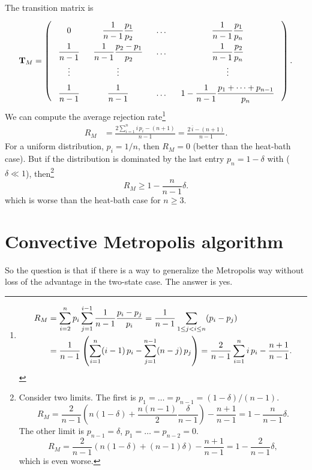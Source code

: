 \documentclass[12pt]{article}
\begin{document}
The transition matrix is
$$
\mathbf T_M =
\left(
  \arraycolsep=8.0pt\def\arraystretch{2.0}
  \begin{array}{cccccc}
    0   & \dfrac{1}{n-1}\dfrac{p_1}{p_2} & \dots & \dfrac{1}{n-1}\dfrac{p_1}{p_n} \\
    \dfrac{1}{n-1} & \dfrac{1}{n-1}\dfrac{p_2-p_1}{p_2} & \dots & \dfrac{1}{n-1}\dfrac{p_2}{p_n} \\
    \vdots & \vdots  &  & \vdots \\
    \dfrac{1}{n-1} & \dfrac{1}{n-1} & \dots & 1 - \dfrac{1}{n-1}\dfrac{p_1 + \cdots + p_{n-1}}{p_n}
  \end{array}
\right).
$$
We can compute the average rejection rate\footnote{
\begin{align*}
  R_M
  &= \sum_{i = 2}^n p_i \sum_{j = 1}^{i-1} \frac{1}{n-1} \frac{p_i - p_j} { p_i }
  = \frac{1}{n-1} \sum_{1 \le j < i \le n} (p_i - p_j)
  \notag \\
  &= \frac{1}{n-1} \left( \sum_{i=1}^n (i - 1) \, p_i - \sum_{j = 1}^{n-1} (n - j) \, p_j \right)
  = \frac{2}{n-1} \sum_{i=1}^n i \, p_i - \frac{n+1}{n-1}.
\end{align*}
}
\begin{align}
  R_M
  &= \frac{2 \sum_{i=1}^n i \, p_i - (n + 1) }{n-1}
  = \frac{ 2 \, \overline i - (n + 1) } { n - 1 }.
\label{eq:rejection_Metropolis}
\end{align}
For a uniform distribution, $p_i = 1/n$, then $R_M = 0$
(better than the heat-bath case).
But if the distribution is dominated by
the last entry $p_n = 1 - \delta$
with ($\delta \ll 1$),
then\footnote{
Consider two limits.
The first is $p_1 = \dots = p_{n-1} = (1-\delta)/(n-1)$.
$$
R_M = \frac{2}{n-1}
\left( n (1 - \delta) + \frac{n(n-1)}{2} \frac{\delta}{n-1} \right)
- \frac{ n + 1 } { n - 1 } = 1 - \frac{n}{n-1}\delta.
$$
The other limit is $p_{n-1} = \delta$, $p_1 = \dots = p_{n-2} = 0$.
$$
R_M = \frac{2}{n-1}
\left( n (1 - \delta) + (n-1)\delta \right)
- \frac{ n + 1 } { n - 1 } = 1 - \frac{2}{n-1}\delta,
$$
which is even worse.
}
$$
R_M \ge 1 - \frac{n}{n-1}\delta.
$$
which is worse than the heat-bath case for $n \ge 3$.
%



\section{\label{sec:convective}
Convective Metropolis algorithm}



So the question is that if there is a way to generalize
the Metropolis way without loss of the advantage in the two-state case.
%
The answer is yes.
\end{document}
